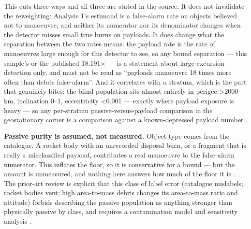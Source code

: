 \documentclass[11pt]{article}
\begin{document}
This cuts three ways and all three are stated in the source. It does not invalidate the reweighting: Analysis 1's estimand is a false-alarm rate on objects believed not to manoeuvre, and neither its numerator nor its denominator changes when the detector misses small true burns on payloads. It does change what the separation between the two rates means: the payload rate is the rate of manoeuvres large enough for this detector to see, so any bound separation --- this sample's or the published 18.191$\times$ --- is a statement about large-excursion detection only, and must not be read as ``payloads manoeuvre 18 times more often than debris false-alarm''. And it correlates with a stratum, which is the part that genuinely bites: the blind population sits almost entirely in perigee >2000 km, inclination 0--1\textdegree{}, eccentricity <0.001 --- exactly where payload exposure is heavy --- so any per-stratum passive-versus-payload comparison in the geostationary corner is a comparison against a known-depressed payload number%
.

\textbf{Passive purity is assumed, not measured.} Object type comes from the catalogue. A rocket body with an unrecorded disposal burn, or a fragment that is really a misclassified payload, contributes a real manoeuvre to the false-alarm numerator. This inflates the floor, so it is conservative for a bound --- but the amount is unmeasured, and nothing here answers how much of the floor it is%
. The prior-art review is explicit that this class of label error (catalogue mislabels; rocket bodies vent; high area-to-mass debris changes its area-to-mass ratio and attitude) forbids describing the passive population as anything stronger than physically passive by class, and requires a contamination model and sensitivity analysis%
.
\end{document}
